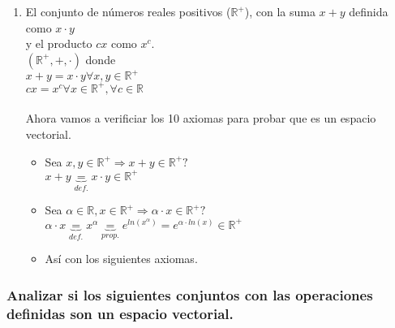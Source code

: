 \documentclass{article}
\begin{document}
\begin{enumerate}
\item El conjunto de números reales positivos ($\mathbb{R}^+$), con la suma $x+y$ definida como $x \cdot y$ \\
y el producto $cx$ como $x^c$. \\
	$(\mathbb{R}^+,+,\cdot)$ donde \\ 
	\hspace*{3cm}$x+y = x \cdot y \forall x,y \in \mathbb{R}^+$ \\
	\hspace*{3cm}$cx = x^c \forall x \in \mathbb{R}^+, \forall c \in \mathbb{R}$  \\ \\
	Ahora vamos a verificiar los 10 axiomas para probar que es un espacio vectorial.
	\begin{itemize}
	\item
		Sea $x,y \in \mathbb{R}^+ \Rightarrow x+y \in \mathbb{R}^+?$ \\
		$x+y \underbrace{=}_{def.} x \cdot y \in \mathbb{R}^+$
	\item
		Sea $\alpha \in \mathbb{R}, x \in \mathbb{R}^+ \Rightarrow \alpha \cdot x \in \mathbb{R}^+?$ \\
		$\alpha \cdot x \underbrace{=}_{def.} x^\alpha \underbrace{=}_{prop.} e^{ln(x^\alpha)} = e^{\alpha \cdot ln(x)} \in \mathbb{R}^+$
	\item Así con los siguientes axiomas.
	\end{itemize}
\end{enumerate}



\subsubsection{Analizar si los siguientes conjuntos con las operaciones definidas son un espacio vectorial.}
\end{document}
